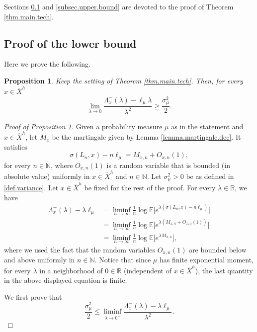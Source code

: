 \documentclass[JEP,XML,SOM,Unicode,published]{cedram}
\theoremstyle{plain}
\newtheorem{proposition}[theorem]{Proposition}
\theoremstyle{definition}
\newcommand\E{\mathbb{E}}
\newcommand\R{\mathbb{R}}
\newcommand\N{\mathbb{N}}
\begin{document}
Sections \ref{subsec.lower.bound} and \ref{subsec.upper.bound} are devoted to the proof of Theorem \ref{thm.main.tech}.

\subsection{Proof of the lower bound}\label{subsec.lower.bound}

Here we prove the following.
\begin{proposition}\label{prop.lower.bound}
Keep the setting of Theorem \ref{thm.main.tech}. Then, for every $x\in \overline{X}^h$
\[
\lim_{\lambda \to 0} \frac{\Lambda_x^-(\lambda)-\ell_\mu \lambda }{\lambda^2} \geq \frac{\sigma^2_{\mu}}{2} .
\]
\end{proposition}

\begin{proof}[Proof of Proposition \ref{prop.lower.bound}]

Given a probability measure $\mu$ as in the statement and $x \in \overline{X}^h$, let $M_{x}$ be the martingale given by Lemma \ref{lemma.martingale.dec}. It satisfies
\[
\sigma(L_n,x)-n\ell_\mu=M_{x,n}+O_{x,n}(1),
\]
for every $n \in \N$, where $O_{x,n}(1)$ is a random variable that is bounded (in absolute value) uniformly in $x \in \overline{X}^h$ and $n\in \N$. Let $\sigma_\mu^2>0$ be as defined in \eqref{def.variance}. Let $x \in \overline{X}^h$ be fixed for the rest of the proof. For every $\lambda \in \R$, we have
\begin{align*}\label{observe}
\Lambda_x^-(\lambda)-\lambda \ell_{\mu} & =  \liminf_{n \to \infty}\frac{1}{n}\log \E\bigl[e^{\lambda (\sigma(L_n,x) - n\ell_{\mu})}\bigr]\\
& = \liminf_{n \to \infty} \frac{1}{n}\log \E\bigl[e^{\lambda(M_{x,n} +O_{x,n}(1))}\bigr]\\
& = \liminf_{n \to \infty} \frac{1}{n}\log \E\bigl[e^{\lambda M_{x,n}}\bigr], \end{align*}
where we used the fact that the random variables $O_{x,n}(1)$ are bounded below and above uniformly in $n \in \N$. Notice that since $\mu$ has finite exponential moment, for every $\lambda$ in a neighborhood of $0 \in \R$ (independent of $x \in \overline{X}^h$), the last quantity in the above displayed equation is finite.

We first prove that
\begin{equation}\label{eq.main0}
\frac{\sigma_{\mu}^2}{2}\leq \liminf_{\lambda\to 0^+}{\frac{\Lambda_x^-(\lambda)-\lambda \ell_{\mu}}{\lambda^2}}.
\end{equation}


\end{proof}
\end{document}
